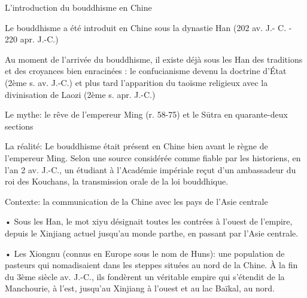





L’introduction du bouddhisme en Chine
 
Le bouddhisme a été introduit en Chine sous la dynastie Han (202 av. J.- C. - 220 apr. J.-C.)

Au moment de l’arrivée du bouddhisme, il existe déjà sous les Han des traditions et des croyances bien enracinées : le confucianisme devenu la doctrine d’État (2ème s. av. J.-C.) et plus tard l’apparition du taoïsme religieux avec la divinisation de Laozi (2ème s. apr. J.-C.)

Le mythe:
le rêve de l’empereur Ming (r. 58-75) et le Sūtra en quarante-deux sections

La réalité:
Le bouddhisme était présent en Chine bien avant le règne de l’empereur Ming.
Selon une source considérée comme fiable par les historiens, en l’an 2 av. J.-C., un étudiant à l’Académie impériale reçut d’un ambassadeur du roi des Kouchans, la transmission orale de la loi bouddhique.
 
Contexte: la communication de la Chine avec les pays de l’Asie centrale

•	Sous les Han, le mot xiyu   désignait toutes les contrées à l’ouest de l’empire, depuis le Xinjiang actuel jusqu’au monde parthe, en passant par l’Asie centrale.

•	Les Xiongnu (connus en Europe sous le nom de Huns): une population de pasteurs qui nomadisaient dans les steppes situées au nord de la Chine. À la fin du 3ème siècle av. J.-C., ils fondèrent un véritable empire qui s’étendit de la Manchourie, à l’est, jusqu’au Xinjiang à l’ouest et au lac Baïkal, au nord.
 









































